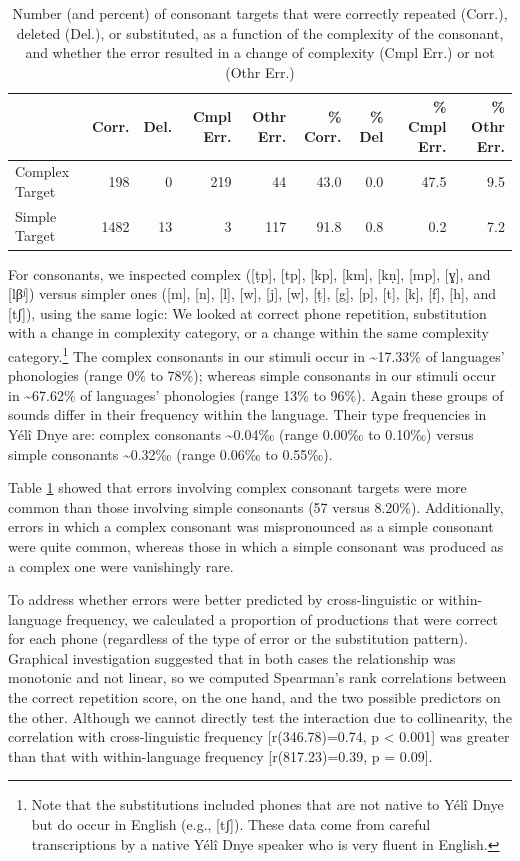 \documentclass[
  american,
  ,man,floatsintext]{apa6}
\begin{document}
\begin{table}

\caption{\label{tab:tab-c}Number (and percent) of consonant targets that were correctly repeated (Corr.), deleted (Del.), or substituted, as a function of the complexity of the consonant, and whether the error resulted in a change of complexity (Cmpl Err.) or not (Othr Err.)}
\centering
\begin{tabular}[t]{lrrrrrrrr}
\toprule
  & Corr. & Del. & Cmpl Err. & Othr Err. & \% Corr. & \% Del & \% Cmpl Err. & \% Othr Err.\\
\midrule
Complex Target & 198 & 0 & 219 & 44 & 43.0 & 0.0 & 47.5 & 9.5\\
Simple Target & 1482 & 13 & 3 & 117 & 91.8 & 0.8 & 0.2 & 7.2\\
\bottomrule
\end{tabular}
\end{table}

For consonants, we inspected complex ({[}ṭp{]}, {[}tp{]}, {[}kp{]}, {[}km{]}, {[}kṇ{]}, {[}mp{]}, {[}ɣ{]}, and {[}lβʲ{]}) versus simpler ones ({[}m{]}, {[}n{]}, {[}l{]}, {[}w{]}, {[}j{]}, {[}w{]}, {[}ṭ{]}, {[}g{]}, {[}p{]}, {[}t{]}, {[}k{]}, {[}f{]}, {[}h{]}, and {[}tʃ{]}), using the same logic: We looked at correct phone repetition, substitution with a change in complexity category, or a change within the same complexity category.\footnote{Note that the substitutions included phones that are not native to Yélî Dnye but do occur in English (e.g., {[}tʃ{]}). These data come from careful transcriptions by a native Yélî Dnye speaker who is very fluent in English.}
The complex consonants in our stimuli occur in \textasciitilde17.33\% of languages' phonologies (range 0\% to 78\%);
whereas simple consonants in our stimuli occur in \textasciitilde67.62\% of languages' phonologies (range 13\% to 96\%).
Again these groups of sounds differ in their frequency within the language. Their type frequencies in Yélî Dnye are: complex consonants \textasciitilde0.04‰ (range 0.00‰ to 0.10‰) versus simple consonants \textasciitilde0.32‰ (range 0.06‰ to 0.55‰).

Table \ref{tab:tab-c} showed that errors involving complex consonant targets were more common than those involving simple consonants (57 versus 8.20\%). Additionally, errors in which a complex consonant was mispronounced as a simple consonant were quite common, whereas those in which a simple consonant was produced as a complex one were vanishingly rare.

To address whether errors were better predicted by cross-linguistic or within-language frequency, we calculated a proportion of productions that were correct for each phone (regardless of the type of error or the substitution pattern). Graphical investigation suggested that in both cases the relationship was monotonic and not linear, so we computed Spearman's rank correlations between the correct repetition score, on the one hand, and the two possible predictors on the other. Although we cannot directly test the interaction due to collinearity, the correlation with cross-linguistic frequency {[}r(346.78)=0.74, p \textless{} 0.001{]} was greater than that with within-language frequency {[}r(817.23)=0.39, p = 0.09{]}.
\end{document}
